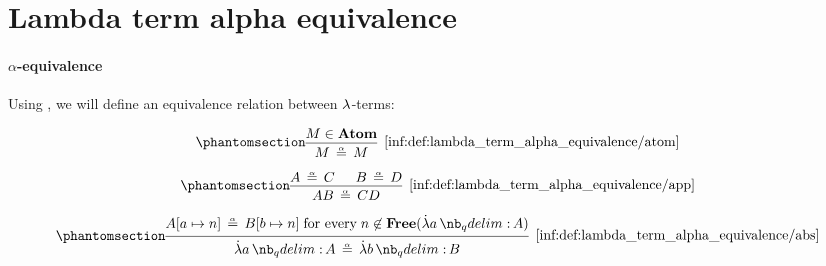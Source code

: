 \section{Lambda term alpha equivalence}\label{sec:lambda_term_alpha_equivalence}

\paragraph{\( \alpha \)-equivalence}

\begin{definition}\label{def:lambda_term_alpha_equivalence}\mimprovised
  Using , we will define an equivalence relation between \( {\mathrm \lambda} \)-terms:

  \begin{paracol}{2}
    \begin{leftcolumn}
      \ParacolAlignmentHack
      \begin{equation*}\taglabel[\ensuremath{ \logic{Atom}_\alpha }]{inf:def:lambda_term_alpha_equivalence/atom}
        \begin{prooftree}
          \hypo{ M \in \op*{Atom} }
          \infer1[\ref{inf:def:lambda_term_alpha_equivalence/atom}]{ M \aequiv M }
        \end{prooftree}
      \end{equation*}
    \end{leftcolumn}

    \begin{rightcolumn}
      \ParacolAlignmentHack
      \begin{equation*}\taglabel[\ensuremath{ \logic{App}_\alpha }]{inf:def:lambda_term_alpha_equivalence/app}
        \begin{prooftree}
          \hypo{ A \aequiv C }
          \hypo{ B \aequiv D }
          \infer2[\ref{inf:def:lambda_term_alpha_equivalence/app}]{ AB \aequiv CD }
        \end{prooftree}
      \end{equation*}
    \end{rightcolumn}
  \end{paracol}

  \begin{equation*}\taglabel[\ensuremath{ \logic{Abs}_\alpha }]{inf:def:lambda_term_alpha_equivalence/abs}
    \begin{prooftree}
      \hypo{ A[a \mapsto n] \aequiv B[b \mapsto n] \T{for every} n \not\in \op*{Free}(\qabs a A) }
      \infer1[\ref{inf:def:lambda_term_alpha_equivalence/abs}]{ \qabs a A \aequiv \qabs b B }
    \end{prooftree}
  \end{equation*}


\end{definition}
